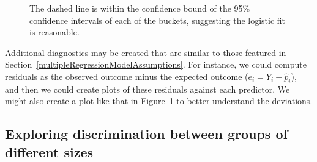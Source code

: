 %

\begin{figure}
  \centering
  \caption{The dashed line is within the confidence bound
       of the 95\% confidence intervals of each of the buckets,
       suggesting the logistic fit is reasonable.}
  \label{logisticModelBucketDiag}
\end{figure}

Additional diagnostics may be created that are similar to those
featured in Section~\ref{multipleRegressionModelAssumptions}.
For instance, we could compute residuals as
the observed outcome minus the expected outcome
($e_i = Y_i - \hat{p}_i$),
and then we could create plots of these residuals
against each predictor.
We might also create a plot like that in
Figure~\ref{logisticModelBucketDiag}
to better understand the deviations.



\newpage

\subsection{Exploring discrimination between groups
    of different sizes}


